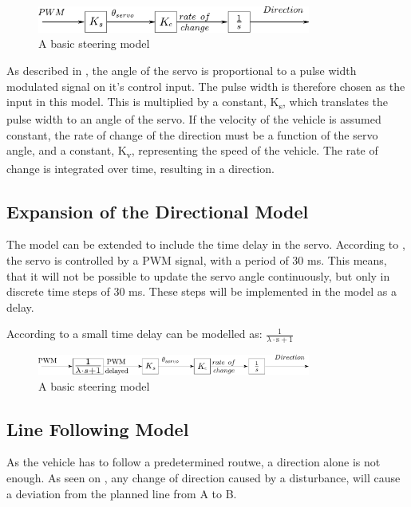 \begin{figure}[H]
	\centering
	\includegraphics[width=0.8\textwidth]{figures/basicSteeringModel.pdf}
	\caption{A basic steering model}
	\label{basicSteering}
\end{figure}
 
As described in , the angle of the servo is proportional to a pulse width modulated signal on it's control input. The pulse width is therefore chosen as the input in this model. This is multiplied by a constant, \si{K_s}, which translates the pulse width to an angle of the servo.
If the velocity of the vehicle is assumed constant, the rate of change of the direction must be a function of the servo angle, and a constant, \si{K_v}, representing the speed of the vehicle.
The rate of change is integrated over time, resulting in a direction. 

\subsection{Expansion of the Directional Model}

The model can be extended to include the time delay in the servo. According to , the servo is controlled by a PWM signal, with a period of 30 ms. This means, that it will not be possible to update the servo angle continuously, but only in discrete time steps of 30 ms. These steps will be implemented in the model as a delay.



According to  a small time delay can be modelled as:
$\frac{1}{\lambda\cdot\text{s}+1}$ 

\begin{figure}[H]
	\centering
	\includegraphics[width=0.8\textwidth]{figures/basicSteeringModelWithDelay.pdf}
	\caption{A basic steering model}
	\label{basicSteeringWithDelay}
\end{figure}

\subsection{Line Following Model}
As the vehicle has to follow a predetermined routwe, a direction alone is not enough. As seen on , any change of direction caused by a disturbance, will cause a deviation from the planned line from A to B.

